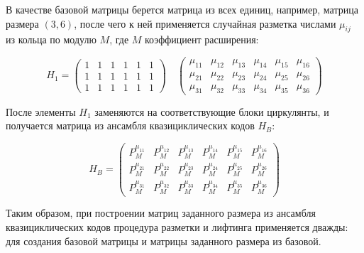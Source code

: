 В качестве базовой матрицы берется матрица из всех единиц, например, матрица размера $(3,6)$,
после чего к ней применяется случайная разметка числами $\mu_{ij}$ из кольца по модулю $M$,
 где $M$ коэффициент
расширения:

\[
	H_1 = \begin{pmatrix}
		1 & 1 & 1 & 1 & 1 & 1 \\
		1 & 1 & 1 & 1 & 1 & 1 \\
		1 & 1 & 1 & 1 & 1 & 1
	\end{pmatrix}
	\quad
	\begin{pmatrix}
		\mu_{11} & \mu_{12} & \mu_{13} & \mu_{14} & \mu_{15} & \mu_{16} \\
		\mu_{21} & \mu_{22} & \mu_{23} & \mu_{24} & \mu_{25} & \mu_{26} \\
		\mu_{31} & \mu_{32} & \mu_{33} & \mu_{34} & \mu_{35} & \mu_{36}
	\end{pmatrix}
\]

После элементы $H_1$ заменяются на соответствующие блоки циркулянты, и получается матрица из ансамбля
квазициклических кодов $H_B$:

\[
H_B=\begin{pmatrix}
		P^{\mu_{11}}_M & P^{\mu_{12}}_M & P^{\mu_{13}}_M & P^{\mu_{14}}_M & P^{\mu_{15}}_M & P^{\mu_{16}}_M \\
		P^{\mu_{21}}_M & P^{\mu_{22}}_M & P^{\mu_{23}}_M & P^{\mu_{24}}_M & P^{\mu_{25}}_M & P^{\mu_{26}}_M \\
		P^{\mu_{31}}_M & P^{\mu_{32}}_M & P^{\mu_{33}}_M & P^{\mu_{34}}_M & P^{\mu_{35}}_M & P^{\mu_{36}}_M
	\end{pmatrix}
\]

Таким образом, при построении матриц заданного размера из ансамбля квазициклических кодов 
процедура разметки и лифтинга
применяется дважды: для создания базовой матрицы и матрицы заданного размера из базовой.

















































